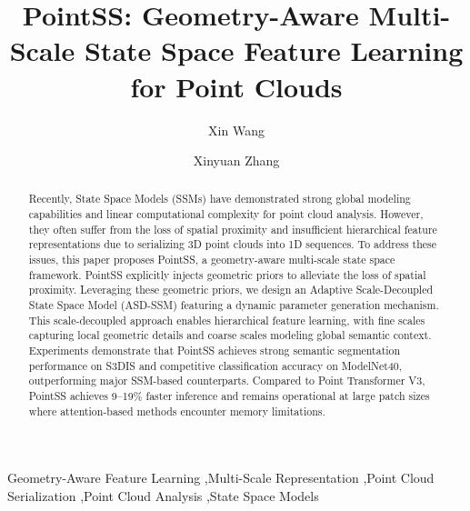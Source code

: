 \documentclass[a4paper,fleqn]{cas-dc}
\begin{document}
\let\WriteBookmarks\relax
\def\floatpagepagefraction{1}
\def\textpagefraction{.001}

\title[mode=title]{PointSS: Geometry-Aware Multi-Scale State Space Feature Learning for Point Clouds}

\author[1,2,3]{Xin Wang}
\cormark[1]                                                                 
\author[1]{Xinyuan Zhang}


\begin{abstract}Recently, State Space Models (SSMs) have demonstrated strong global modeling
capabilities and linear computational complexity for point cloud analysis.
However, they often suffer from the loss of spatial proximity and insufficient
hierarchical feature representations due to serializing 3D point clouds into
1D sequences. To address these issues, this paper proposes PointSS, a
geometry-aware multi-scale state space framework. PointSS explicitly injects
geometric priors to alleviate the loss of spatial proximity. Leveraging these
geometric priors, we design an Adaptive Scale-Decoupled State Space Model
(ASD-SSM) featuring a dynamic parameter generation mechanism. This
scale-decoupled approach enables hierarchical feature learning, with fine scales
capturing local geometric details and coarse scales modeling global semantic
context. Experiments demonstrate that PointSS achieves strong
semantic segmentation performance on S3DIS and competitive classification
accuracy on ModelNet40, outperforming major SSM-based counterparts. Compared to Point Transformer V3, PointSS
achieves 9--19\% faster inference and remains operational at large patch sizes where
attention-based methods encounter memory limitations.
\end{abstract}

\begin{keywords}Geometry-Aware Feature Learning \sep Multi-Scale Representation \sep Point Cloud Serialization \sep Point Cloud Analysis \sep State Space Models
\end{keywords}
\end{document}
